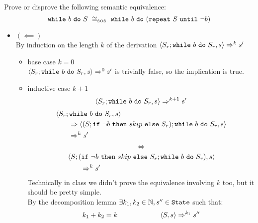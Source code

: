\begin{exercise}{
    Prove or disprove the following semantic equivalence:
    \[ \wwhile{b}{S}\ \SOScong\ \wwhile{b}{(\wrepeat{S}{\neg b})}  \]
}
\begin{itemize}
\begin{itemize}
\begin{itemize}
\begin{itemize}
\begin{align*}
                                    \end{align*}
                                    Since $\instr{S; \wwhile{b}{S}}{s''} \Rightarrow^{k_2 - 2} s'$ and $k_2 - 2 = k - k_1 - 1 \leq k$ the inductive hypothesis holds and thus $\instr{S_r; \wwhile{b}{S_r}}{s''} \Rightarrow^* s'$
                            \end{itemize}
                    \end{itemize}
                \item $(\impliedby)$ \vspace{0.2cm} \\
                    By induction on the length $k$ of the derivation $\left<S_r; \texttt{while}\ b\ \texttt{do}\ S_r, s\right> \Rightarrow^k s'$
                    \begin{itemize}
                        \item base case $k=0$ \\
                            $\left<S_r; \texttt{while}\ b\ \texttt{do}\ S_r, s\right> \Rightarrow^0 s'$ is trivially false, so the implication is true.
                        \item inductive case $k+1$ \vspace*{-0.3cm}
                        \[ \left<S_r; \texttt{while}\ b\ \texttt{do}\ S_r, s\right> \Rightarrow^{k+1} s' \]
                        \begin{align*}
                            &\left<S_r; \texttt{while}\ b\ \texttt{do}\ S_r, s\right>
                            \\&\qquad\Rightarrow \left<(S; \texttt{if}\ \neg b\ \texttt{then}\ skip\ \texttt{else}\ S_r); \texttt{while}\ b\ \texttt{do}\ S_r, s\right>
                            \\&\qquad\Rightarrow^{k} s'
                        \end{align*}
                        \[ \iff \]
                        \begin{align*}
                            &\left<S; (\texttt{if}\ \neg b\ \texttt{then}\ skip\ \texttt{else}\ S_r; \texttt{while}\ b\ \texttt{do}\ S_r), s\right>
                            \\&\qquad\Rightarrow^{k} s'
                        \end{align*}
                        Technically in class we didn't prove the equivalence involving $k$ too, but it should be pretty simple. \\
                        By the decomposition lemma $\exists k_1, k_2 \in \mathbb{N}, s'' \in \texttt{State}$ such that:
                        \begin{gather*}
                            k_1 + k_2 = k \qquad\qquad\qquad \instr{S}{s} \Rightarrow^{k_1} s'' \\

\end{gather*}
\end{itemize}
\end{itemize}
\end{itemize}
\end{exercise}
